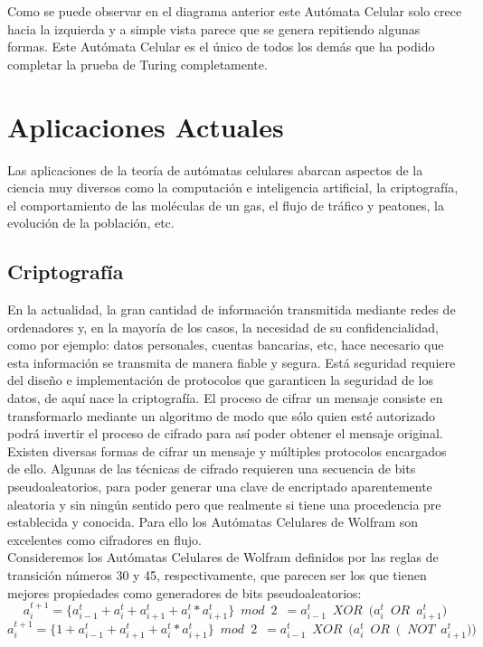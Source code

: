 Como se puede observar en el diagrama anterior este Autómata Celular solo crece hacia la izquierda y a simple vista parece que se genera repitiendo algunas formas. Este Autómata Celular es el único de todos los demás que ha podido completar la prueba de Turing completamente.


\section{Aplicaciones Actuales} %
Las aplicaciones de la teoría de autómatas celulares abarcan aspectos de la ciencia muy diversos como la computación e inteligencia artificial, la criptografía, el comportamiento de las moléculas de un gas, el flujo de tráfico y peatones, la evolución de la población, etc.

\subsection{Criptografía}
En la actualidad, la gran cantidad de información transmitida mediante redes de ordenadores y, en la mayoría de los casos, la necesidad de su confidencialidad, como por ejemplo: datos personales, cuentas bancarias, etc, hace necesario que esta información se transmita de manera fiable y segura. Está seguridad requiere del diseño e implementación de protocolos que garanticen la seguridad de los datos, de aquí nace la criptografía. El proceso de cifrar un mensaje consiste en transformarlo mediante un algoritmo de modo que sólo quien esté autorizado podrá invertir el proceso de cifrado para así poder obtener el mensaje original. Existen diversas formas de cifrar un mensaje y múltiples protocolos encargados de ello. Algunas de las técnicas de cifrado requieren una secuencia de bits pseudoaleatorios, para poder generar una clave de encriptado aparentemente aleatoria y sin ningún sentido pero que realmente si tiene una procedencia pre establecida y conocida. Para ello los Autómatas Celulares de Wolfram son excelentes como cifradores en flujo.\\

Consideremos los Autómatas Celulares de Wolfram definidos por las reglas de transición números 30 y 45, respectivamente, que parecen ser los que tienen mejores propiedades como generadores de bits pseudoaleatorios:
$$a_i^{t+1}  =  \lbrace a_{i-1}^t + a_i^t + a_{i+1}^t + a_i^t * a_{i+1}^t \rbrace \enspace  mod\enspace 2\enspace = a_{i-1}^t  \enspace XOR \enspace \big( a_i^t \enspace OR \enspace a_{i+1}^t \big) $$ 
$$a_i^{t+1}  =  \lbrace 1 + a_{i-1}^t + a_{i+1}^t + a_i^t * a_{i+1}^t \rbrace \enspace  mod\enspace 2\enspace = a_{i-1}^t  \enspace XOR \enspace \big( a_i^t \enspace OR \enspace \big( \enspace NOT \enspace a_{i+1}^t \big)\big) $$ 

